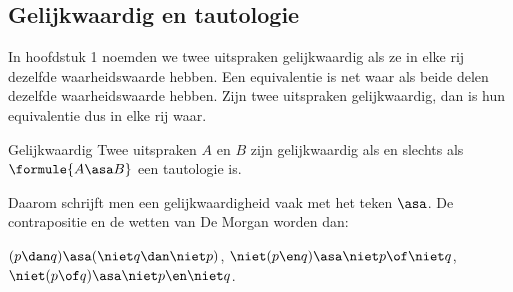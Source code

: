 \begin{oefeningen}
\end{oefeningen}

\subsection{Gelijkwaardig en tautologie}

In hoofdstuk 1 noemden we twee uitspraken gelijkwaardig als ze in elke rij dezelfde waarheidswaarde hebben. Een equivalentie is net waar als beide delen dezelfde waarheidswaarde hebben. Zijn twee uitspraken gelijkwaardig, dan is hun equivalentie dus in elke rij waar.

\begin{theorie}
\begin{stelling}{Gelijkwaardig}
Twee uitspraken $A$ en $B$ zijn gelijkwaardig als en slechts als $\formule{A \asa B}$ een tautologie is.
\end{stelling}
\end{theorie}

Daarom schrijft men een gelijkwaardigheid vaak met het teken $\asa$. De contrapositie en de wetten van De Morgan worden dan:

\smallskip
\qquad $(p \dan q) \asa (\niet q \dan \niet p)$, \qquad $\niet(p \en q) \asa \niet p \of \niet q$, \qquad $\niet(p \of q) \asa \niet p \en \niet q$.


\begin{oefeningen}
\end{oefeningen}

